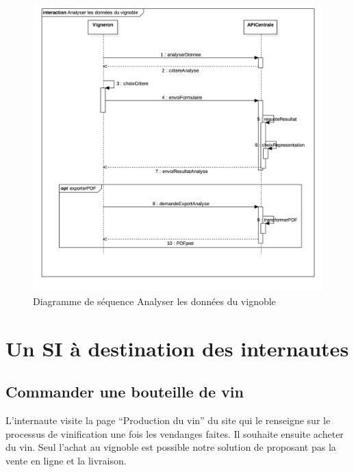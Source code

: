 \documentclass[a4paper, titlepage]{report}
\begin{document}
\clearpage
\begin{figure}[!ht]
\centering
\includegraphics{Images/SequenceDiagramAnalyserDonneesVignoble.jpg}
\caption{Diagramme de séquence Analyser les données du vignoble}
\end{figure}

\clearpage
\section{Un SI à destination des internautes}\label{un-si-a-destination-des-internautes}

\subsection{Commander une bouteille de vin}\label{commander-une-bouteille-de-vin}

L'internaute visite la page ``Production du vin'' du site qui le
renseigne sur le processus de vinification une fois les vendanges
faites. Il souhaite ensuite acheter du vin. Seul l'achat au vignoble est
possible notre solution de proposant pas la vente en ligne et la
livraison.
\end{document}
